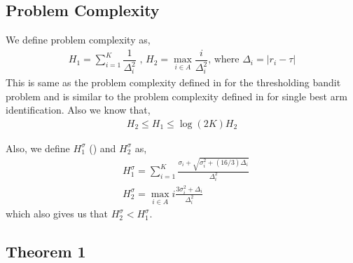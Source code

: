 

\subsection{Problem Complexity}

We define problem complexity as,
\begin{align*}
H_{1} = \sum_{i=1}^{K}\dfrac{1}{\Delta_{i}^{2}} \text{ ,   } H_{2}=\max_{i\in A}\dfrac{i}{{\Delta_{i}^{2}}} \text{, where } \Delta_{i}=|r_{i}-\tau|
\end{align*}
This is same as the problem complexity defined in \cite{locatelli2016optimal} for the thresholding bandit problem and is similar to the problem complexity defined in \cite{audibert2010best} for single best arm identification. Also we know that,
\begin{align*}
H_{2}\leq H_{1}\leq \log(2K)H_{2}
\end{align*}

Also, we define $H_{1}^{\sigma}$ (\cite{gabillon2011multi}) and $H_{2}^{\sigma}$ as,
\begin{align*}
& H_{1}^{\sigma}=\sum_{i=1}^{K}\frac{\sigma_{i}+\sqrt{\sigma_{i}^{2}+(16/3)\Delta_{i}}}{\Delta_{i}^{2}}\\
& H_{2}^{\sigma}=\max_{i\in A} i\frac{3\sigma_{i}^{2} + \Delta_i}{\Delta_i^{2}}
\end{align*}
which also gives us that $H_{2}^{\sigma} < H_{1}^{\sigma}$.


\subsection{Theorem 1}


